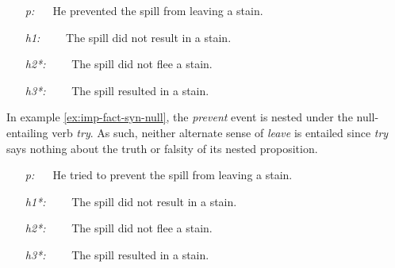 \begin{covex}\label{ex:imp-fact-syn}
\begin{itemize} \itemsep -1pt
  \item[{\it p:}]~~    He prevented the spill from leaving a stain.
  \item[{\it h1:}]~~~~The spill did not result in a stain.
  \item[{\it h2*:}]~~~~The spill did not flee a stain.
  \item[{\it h3*:}]~~~~The spill resulted in a stain.
\end{itemize}
\end{covex}

In example \eqref{ex:imp-fact-syn-null}, the {\it prevent} event is nested under
the null-entailing verb {\it try}.  As such, neither alternate sense of {\it
leave} is entailed since {\it try} says nothing about the truth or falsity of
its nested proposition.

\begin{covex}\label{ex:imp-fact-syn-null}
\begin{itemize} \itemsep -1pt
  \item[{\it p:}]~~    He tried to prevent the spill from leaving a stain.
  \item[{\it h1*:}]~~~~The spill did not result in a stain.
  \item[{\it h2*:}]~~~~The spill did not flee a stain.
  \item[{\it h3*:}]~~~~The spill resulted in a stain.
\end{itemize}
\end{covex}
  

% 

